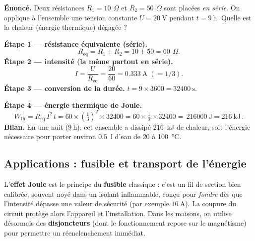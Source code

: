 \documentclass[11pt,a4paper]{article}
\newcommand{\ohm}{\,\Omega}
\begin{document}
\begin{exemple}
\textbf{Énoncé.} Deux résistances $R_1=\SI{10}{\ohm}$ et $R_2=\SI{50}{\ohm}$ sont placées \emph{en
série}. On applique à l'ensemble une tension constante $U=\SI{20}{\volt}$ pendant $t=\SI{9}{\hour}$.
Quelle est la chaleur (énergie thermique) dégagée ?

\smallskip
\textbf{Étape 1 — résistance équivalente (série).}
\[ R_{\mathrm{eq}} = R_1 + R_2 = 10 + 50 = \SI{60}{\ohm}. \]
\textbf{Étape 2 — intensité (la même partout en série).}
\[ I = \frac{U}{R_{\mathrm{eq}}} = \frac{20}{60} = \SI{0,333}{\ampere}\;(=1/3). \]
\textbf{Étape 3 — conversion de la durée.}
$t = 9\times 3600 = \SI{32400}{\second}$.

\textbf{Étape 4 — énergie thermique de Joule.}
\[ W_{\mathrm{th}} = R_{\mathrm{eq}}\,I^{2}\,t = 60 \times \left(\tfrac{1}{3}\right)^{2} \times 32400
   = 60 \times \tfrac{1}{9}\times 32400 = \boxed{\,\SI{216000}{\joule} = \SI{216}{\kilo\joule}\,}. \]
\textbf{Bilan.} En une nuit ($\SI{9}{\hour}$), cet ensemble a dissipé \SI{216}{\kilo\joule} de chaleur,
soit l'énergie nécessaire pour porter environ \SI{0,5}{\litre} d'eau de \SI{20}{} à
\SI{100}{\degreeCelsius}.
\end{exemple}

\subsection{Applications : fusible et transport de l'énergie}

\begin{remarque}
L'\textbf{effet Joule} est le principe du \textbf{fusible} classique : c'est un fil de section bien
calibrée, souvent noyé dans un isolant inflammable, conçu pour \emph{fondre} dès que l'intensité
dépasse une valeur de sécurité (par exemple $\SI{16}{\ampere}$). La coupure du circuit protège alors
l'appareil et l'installation. Dans les maisons, on utilise désormais des \textbf{disjoncteurs} (dont
le fonctionnement repose sur le magnétisme) pour permettre un réenclenchement immédiat.
\end{remarque}
\end{document}
